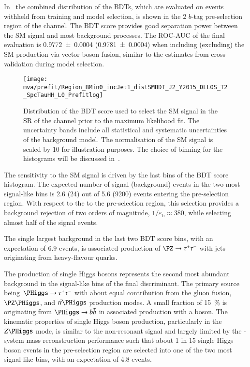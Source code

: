In~ the combined distribution of the BDTs,
which are evaluated on events withheld from training and model
selection, is shown in the 2 $b$-tag pre-selection region of the
\hadhad channel. The BDT score provides good separation power between
the SM \HH signal and most background processes. The ROC-AUC of the
final evaluation is \num{0.9772 +- 0.0004} (\num{0.9781 +- 0.0004})
when including (excluding) the SM \HH production via vector boson
fusion, similar to the estimates from cross validation during model
selection.

\begin{figure}[htbp]
  \centering

  \texttt{[image: mva/prefit/Region\_BMin0\_incJet1\_distSMBDT\_J2\_Y2015\_DLLOS\_T2\_SpcTauHH\_L0\_Prefitlog]}

  \caption{Distribution of the BDT score used to select the SM \HH
    signal in the SR of the \hadhad channel prior to the maximum
    likelihood fit. The uncertainty bands include all statistical and
    systematic uncertainties of the background model. The
    normalisation of the SM \HH signal is scaled by 10 for
    illustration purposes. The choice of binning for the histograms
    will be discussed in~.}
  \label{fig:mva_smbdt_prefit}
\end{figure}

The sensitivity to the SM \HH signal is driven by the last bins of the
BDT score histogram.  The expected number of signal (background)
events in the two most signal-like bins is 2.6 (24) out of 5.6 (9200)
events entering the pre-selection region. With respect to the to the
pre-selection region, this selection provides a background rejection
of two orders of magnitude, $1 / \varepsilon_{\text{b}} \approx 380$,
while selecting almost half of the signal events.

The single largest background in the last two BDT score bins, with an
expectation of 6.9 events, is associated production of
$\PZ \rightarrow \tautau$ with jets originating from heavy-flavour
quarks.

The production of single Higgs bosons represents the second most
abundant background in the signal-like bins of the final
discriminant. The primary source being~$\PHiggs \rightarrow \tautau$
with about equal contribution from the gluon fusion, $\PZ\PHiggs$, and
$\ttbar\PHiggs$ production modes. A small fraction of
\SI{15}{\percent} is originating from $\PHiggs \rightarrow \bbbar$ in
associated production with a \PZ boson. The kinematic properties of
single Higgs boson production, particularly in the $Z\PHiggs$ mode, is
similar to the non-resonant \HH signal and largely limited by the
\PHiggs-system mass reconstruction performance such that about 1 in 15
single Higgs boson events in the pre-selection region are selected
into one of the two most signal-like bins, with an expectation of 4.8
events.

